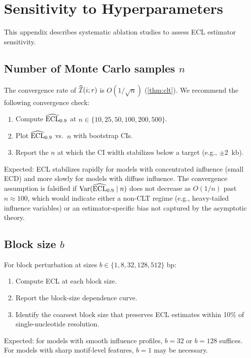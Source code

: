 \section{Sensitivity to Hyperparameters}\label{app:sensitivity}

This appendix describes systematic ablation studies to assess ECL estimator sensitivity.

\subsection{Number of Monte Carlo samples $n$}

The convergence rate of $\widehat{\mathcal{I}}(i;r)$ is $O(1/\sqrt{n})$ (\cref{thm:clt}). We recommend the following convergence check:
\begin{enumerate}[leftmargin=2em, label=(\roman*)]
\item Compute $\widehat{\mathrm{ECL}}_{0.9}$ at $n \in \{10, 25, 50, 100, 200, 500\}$.
\item Plot $\widehat{\mathrm{ECL}}_{0.9}$ vs.\ $n$ with bootstrap CIs.
\item Report the $n$ at which the CI width stabilizes below a target (e.g., $\pm$2~kb).
\end{enumerate}
Expected: ECL stabilizes rapidly for models with concentrated influence (small ECD) and more slowly for models with diffuse influence. The convergence assumption is falsified if $\operatorname{Var}(\widehat{\mathrm{ECL}}_{0.9} \mid n)$ does not decrease as $O(1/n)$ past $n \approx 100$, which would indicate either a non-CLT regime (e.g., heavy-tailed influence variables) or an estimator-specific bias not captured by the asymptotic theory.

\subsection{Block size $b$}

For block perturbation at sizes $b \in \{1, 8, 32, 128, 512\}$ bp:
\begin{enumerate}[leftmargin=2em, label=(\roman*)]
\item Compute ECL at each block size.
\item Report the block-size dependence curve.
\item Identify the coarsest block size that preserves ECL estimates within 10\% of single-nucleotide resolution.
\end{enumerate}
Expected: for models with smooth influence profiles, $b=32$ or $b=128$ suffices. For models with sharp motif-level features, $b=1$ may be necessary.

